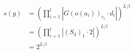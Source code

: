 \documentclass[preview]{standalone}
\begin{document}
\begin{align*}
s(g) &= \left(\prod_{i=1}^{l}\left|G(o(a_i))_{c_i}\cdot d_i\right|\right)^{L/l} \\   &= \left(\prod_{i=1}^{l}\left|\left(S_3\right)_{1}\cdot 2\right|\right)^{L/l} \\   &= 2^{L/l}
\end{align*}
\end{document}
